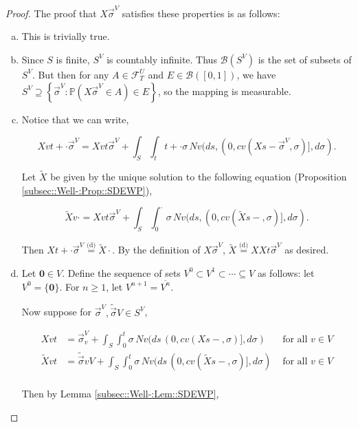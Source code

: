 \documentclass[12pt]{article}
\newcommand{\mb}{\mathbb}
\newcommand{\mc}{\mathcal}
\newcommand{\ms}{\mathscr}
\newcommand{\ov}{\overline}
\newcommand{\te}{\text}
\newcommand{\ind}{\hspace{24pt}}
\newcommand{\pr}{\mb{P}}							%
\newcommand{\deq}{\overset{\text{(d)}}{=}}			%
\renewcommand{\root}{\mathbf{0}}				%
\renewcommand{\v}{v}							%
\renewcommand{\U}{U}							%
\renewcommand{\S}{S}							%
\newcommand{\s}{\sigma}							%
\newcommand{\sv}{\vec{\s}}						%
\newcommand{\T}{T}								%
\renewcommand{\t}{t}							%
\renewcommand{\tt}{s}							%
\newcommand{\F}{\mc{F}}							%
\newcommand{\X}{X}								%
\newcommand{\IGr}{c}							%
\newcommand{\carp}[1]{^{#1}}					%
\newcommand{\vsi}[1]{^{#1}}						%
\newcommand{\cind}[1]{_{#1}}					%
\newcommand{\cl}{\ov}							%
\newcommand{\ts}[1]{_{#1}}						%
\newcommand{\sln}[1]{^{#1}}						%
\newcommand{\poiss}{N}							%
\newcommand{\alt}[1]{\widetilde{#1}}			%
\begin{document}
\begin{proof}
The proof that \(\X{}{}{\sv\cind{}\vsi{V}}\) satisfies these properties is as follows:

\begin{enumerate}[(a)]
\item This is trivially true.

\item Since \(\S\) is finite, \(\S\carp{V}\) is countably infinite. Thus \(\ms{B}(\S\carp{V})\) is the set of subsets of \(\S\carp{V}\). But then for any \(A \in \F\vsi{\U}\ts{\T}\) and \(E \in \ms{B}([0,1])\), we have \(\S\carp{V} \supseteq \left\{\sv\cind{}\vsi{V}: \pr\left(\X{}{}{\sv\cind{}\vsi{V}} \in A\right) \in E\right\}\), so the mapping is measurable.

\item Notice that we can write,

\[\X{\v}{\t+\cdot}{\sv\cind{}\vsi{V}} = \X{\v}{\t}{\sv\cind{}\vsi{V}} + \int_\S\int_\t{\t+\cdot} \s\,\poiss{\v}(d\tt,(0,\IGr{\v}(\X{}{\tt-}{\sv\cind{}\vsi{V}},\s)],d\s).\]

Let \(\alt{\X}{}{}\) be given by the unique solution to the following equation (Proposition \ref{subsec::Well-:Prop::SDEWP}),

\[\alt{\X}{\v}{\cdot} = \X{\v}{\t}{\sv\cind{}\vsi{V}} + \int_\S \int_0^\cdot \s\,\poiss{\v}(d\tt,(0,\IGr{\v}(\alt{\X}{}{\tt-},\s)],d\s).\]

Then \(\X{}{\t+\cdot}{\sv\cind{}\vsi{V}} \deq \alt{\X}{}{\cdot}\). By the definition of \(\X{}{}{\sv\cind{}\vsi{V}}\), \(\alt{\X}{}{} \deq \X{}{}{\X{}{\t}{\sv\cind{}\vsi{V}}}\) as desired.

\item Let \(\root \in V\). Define the sequence of sets \(V\sln{0}\subset V\sln{1}\subset \cdots \subseteq V\) as follows: let \(V\sln{0} = \{\root\}\). For \(n \geq 1\), let \(V\sln{n+1} = \cl{V\sln{n}}\).

\ind Now suppose for \(\sv\cind{}\vsi{V},\alt{\sv}{}{V}\in \S\carp{V}\),

\begin{align*}
\X{\v}{\t} &= \sv\cind{\v}\vsi{V} + \int_\S\int_0^\t \s\,\poiss{\v}(d\tt\,(0,\IGr{\v}(\X{}{\tt-},\s)],d\s)&\te{ for all } \v \in V\\
\alt{\X}{\v}{\t} &= \alt{\sv}{\v}{V} + \int_\S\int_0^\t \s\,\poiss{\v}(d\tt\,(0,\IGr{\v}(\alt{\X}{}{\tt-},\s)],d\s)&\te{ for all } \v \in V\\
\end{align*}

Then by Lemma \ref{subsec::Well-:Lem::SDEWP},


\end{enumerate}
\end{proof}
\end{document}
